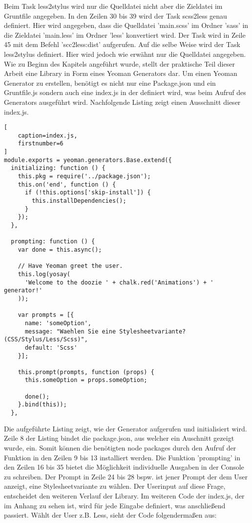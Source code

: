 Beim Task less2stylus wird nur die Quelldatei nicht aber die Zieldatei im Gruntfile angegeben.\newline\newline
In den Zeilen 30 bis 39 wird der Task scss2less genau definiert. Hier wird angegeben, dass die Quelldatei 'main.scss' im Ordner 'sass' in die Zieldatei 'main.less' im Ordner 'less' konvertiert wird. Der Task wird in Zeile 45 mit dem Befehl 'scc2less:dist' aufgerufen.\newline
Auf die selbe Weise wird der Task less2stylus definiert. Hier wird jedoch wie erwähnt nur die Quelldatei angegeben.\newline\newline
Wie zu Beginn des Kapitels angeführt wurde, stellt der praktische Teil dieser Arbeit eine Library in Form eines Yeoman Generators dar. Um einen Yeoman Generator zu erstellen, benötigt es nicht nur eine Package.json und ein Gruntfile.js sondern auch eine index.js in der definiert wird, was beim Aufruf des Generators ausgeführt wird. Nachfolgende Listing zeigt einen Ausschnitt dieser index.js.
\begin{lstlisting}[
	caption=index.js,
	firstnumber=6
]
module.exports = yeoman.generators.Base.extend({
  initializing: function () {
    this.pkg = require('../package.json');
    this.on('end', function () {
      if (!this.options['skip-install']) {
        this.installDependencies();
      }
    });
  },

  prompting: function () {
    var done = this.async();

    // Have Yeoman greet the user.
    this.log(yosay(
      'Welcome to the doozie ' + chalk.red('Animations') + ' generator!'
    ));

    var prompts = [{
      name: 'someOption',
      message: "Waehlen Sie eine Stylesheetvariante? (CSS/Stylus/Less/Scss)",
      default: 'Scss'
    }];

    this.prompt(prompts, function (props) {
      this.someOption = props.someOption;

      done();
    }.bind(this));
  },
\end{lstlisting}
Die aufgeführte Listing zeigt, wie der Generator aufgerufen und initialisiert wird. Zeile 8 der Listing bindet die package.json, aus welcher ein Auschnitt gezeigt wurde, ein.\newline
Somit können die benötigten node packages durch den Aufruf der Funktion in den Zeilen 9 bis 13 installiert werden.\newline
Die Funktion 'prompting' in den Zeilen 16 bis 35 bietet die Möglichkeit individuelle Ausgaben in der Console zu schreiben. Der Prompt in Zeile 24 bis 28 bspw. ist jener Prompt der dem User anzeigt, eine Stylesheetvariante zu wählen. Der Userinput auf diese Frage, entscheidet den weiteren Verlauf der Library. Im weiteren Code der index.js, der im Anhang zu sehen ist, wird für jede Eingabe definiert, was anschließend passiert. Wählt der User z.B. Less, sieht der Code folgendermaßen aus:
